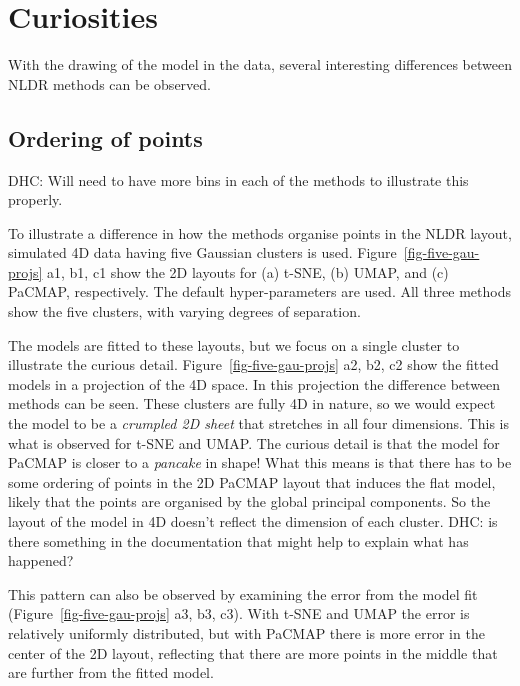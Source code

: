 \documentclass[
  12pt]{article}
\begin{document}
\section{Curiosities}\label{curiosities}

With the drawing of the model in the data, several interesting
differences between NLDR methods can be observed.

\subsection{Ordering of points}\label{ordering-of-points}

DHC: Will need to have more bins in each of the methods to illustrate
this properly.

To illustrate a difference in how the methods organise points in the
NLDR layout, simulated 4D data having five Gaussian clusters is used.
Figure~\ref{fig-five-gau-projs} a1, b1, c1 show the 2D layouts for (a)
t-SNE, (b) UMAP, and (c) PaCMAP, respectively. The default
hyper-parameters are used. All three methods show the five clusters,
with varying degrees of separation.

The models are fitted to these layouts, but we focus on a single cluster
to illustrate the curious detail. Figure~\ref{fig-five-gau-projs} a2,
b2, c2 show the fitted models in a projection of the 4D space. In this
projection the difference between methods can be seen. These clusters
are fully 4D in nature, so we would expect the model to be a
\emph{crumpled 2D sheet} that stretches in all four dimensions. This is
what is observed for t-SNE and UMAP. The curious detail is that the
model for PaCMAP is closer to a \emph{pancake} in shape! What this means
is that there has to be some ordering of points in the 2D PaCMAP layout
that induces the flat model, likely that the points are organised by the
global principal components. So the layout of the model in 4D doesn't
reflect the dimension of each cluster. DHC: is there something in the
documentation that might help to explain what has happened?

This pattern can also be observed by examining the error from the model
fit (Figure~\ref{fig-five-gau-projs} a3, b3, c3). With t-SNE and UMAP
the error is relatively uniformly distributed, but with PaCMAP there is
more error in the center of the 2D layout, reflecting that there are
more points in the middle that are further from the fitted model.
\end{document}
